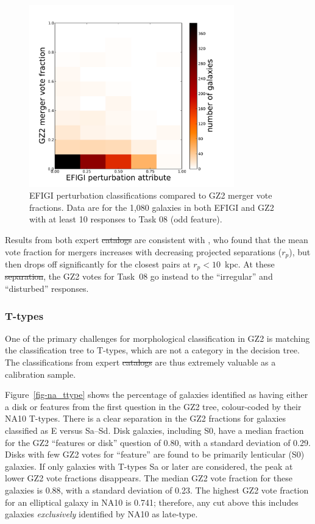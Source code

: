 \documentclass[useAMS,usenatbib]{mn2e}
\providecommand{\DIFaddtex}[1]{{\protect\color{blue}\uwave{#1}}} %
\providecommand{\DIFdeltex}[1]{{\protect\color{red}\sout{#1}}}                      %
\providecommand{\DIFaddbegin}{} %
\providecommand{\DIFaddend}{} %
\providecommand{\DIFdelbegin}{} %
\providecommand{\DIFdelend}{} %
\providecommand{\DIFadd}[1]{\texorpdfstring{\DIFaddtex{#1}}{#1}} %
\providecommand{\DIFdel}[1]{\texorpdfstring{\DIFdeltex{#1}}{}} %
\begin{document}
\begin{figure}
\includegraphics[angle=0,width=3.5in]{figures/efigi_mergers.pdf}
\caption{EFIGI perturbation classifications compared to GZ2 merger vote fractions. Data are for the 1,080 galaxies in both EFIGI and GZ2 with at least 10 responses to Task 08 (odd feature). 
\label{fig-efigi_mergers}}
\end{figure}

Results from both expert \DIFdelbegin \DIFdel{catalogs }\DIFdelend \DIFaddbegin \DIFadd{catalogues }\DIFaddend are consistent with \citet{cas13}, who found that the mean vote fraction for mergers increases with decreasing projected separations ($r_p$), but then drops off significantly for the closest pairs at $r_p < 10$~kpc. At these \DIFdelbegin \DIFdel{separation}\DIFdelend \DIFaddbegin \DIFadd{separations}\DIFaddend , the GZ2 votes for Task~08 go instead to the ``irregular'' and ``disturbed'' responses. 

\subsubsection{T-types}

One of the primary challenges for morphological classification in GZ2 is matching the classification tree to T-types, which are not a category in the decision tree. The classifications from expert \DIFdelbegin \DIFdel{catalogs }\DIFdelend \DIFaddbegin \DIFadd{catalogues }\DIFaddend are thus extremely valuable as a calibration sample. 

Figure~\ref{fig-na_ttype} shows the percentage of galaxies identified as having either a disk or features from the first question in the GZ2 tree, colour-coded by their NA10 T-types. There is a clear separation in the GZ2 fractions for galaxies classified as E versus Sa--Sd. Disk galaxies, including S0, have a median fraction for the GZ2 ``features or disk'' question of 0.80, with a standard deviation of 0.29. Disks with few GZ2 votes for ``feature'' are found to be primarily lenticular (S0) galaxies. If only galaxies with T-types Sa or later are considered, the peak at lower GZ2 vote fractions disappears. The median GZ2 vote fraction for these galaxies is 0.88, with a standard deviation of 0.23. The highest GZ2 vote fraction for an elliptical galaxy in NA10 is 0.741; therefore, any cut above this includes galaxies {\it exclusively} identified by NA10 as late-type. 
\end{document}

